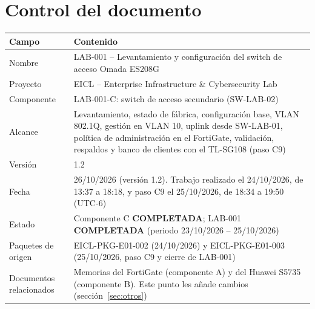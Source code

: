 \documentclass[11pt,a4paper]{article}
\newcommand{\estado}[1]{%
  \ifstrequal{#1}{COMPLETADA}{\textcolor{okgreen}{\textbf{\footnotesize #1}}}{%
  \ifstrequal{#1}{OPERATIVO VALIDADO}{\textcolor{okgreen}{\textbf{\footnotesize #1}}}{%
  \ifstrequal{#1}{OK}{\textcolor{okgreen}{\textbf{\footnotesize #1}}}{%
  \ifstrequal{#1}{RESUELTO}{\textcolor{okgreen}{\textbf{\footnotesize #1}}}{%
  \ifstrequal{#1}{EN CURSO}{\textcolor{amber}{\textbf{\footnotesize #1}}}{%
  \ifstrequal{#1}{REPORTADO}{\textcolor{amber}{\textbf{\footnotesize #1}}}{%
  \ifstrequal{#1}{NO EJECUTADA}{\textcolor{muted}{\textbf{\footnotesize #1}}}{%
  \ifstrequal{#1}{PROPUESTO}{\textcolor{violet}{\textbf{\footnotesize #1}}}{%
  \ifstrequal{#1}{PENDIENTE}{\textcolor{alertred}{\textbf{\footnotesize #1}}}{%
  \textbf{\footnotesize #1}}}}}}}}}}}
\newcommand{\cab}{\rowcolor{light}}
\begin{document}
\pagestyle{preliminar}
\hypersetup{pageanchor=true}

\section*{Control del documento}

\begin{tabularx}{\textwidth}{L{4.0cm} Z}
  \toprule
  \cab\textbf{Campo} & \textbf{Contenido}\\
  \midrule
  Nombre & LAB-001 -- Levantamiento y configuración del switch de acceso Omada ES208G\\
  Proyecto & EICL -- Enterprise Infrastructure \& Cybersecurity Lab\\
  Componente & LAB-001-C: switch de acceso secundario (SW-LAB-02)\\
  Alcance & Levantamiento, estado de fábrica, configuración base, VLAN 802.1Q, gestión en VLAN 10, uplink desde SW-LAB-01, política de administración en el FortiGate, validación, respaldos y banco de clientes con el TL-SG108 (paso C9)\\
  Versión & 1.2\\
  Fecha & 26/10/2026 (versión 1.2). Trabajo realizado el 24/10/2026, de 13:37 a 18:18, y paso C9 el 25/10/2026, de 18:34 a 19:50 (UTC-6)\\
  Estado & Componente C \estado{COMPLETADA}; LAB-001 \estado{COMPLETADA} (periodo 23/10/2026 -- 25/10/2026)\\
  Paquetes de origen & EICL-PKG-E01-002 (24/10/2026) y EICL-PKG-E01-003 (25/10/2026, paso C9 y cierre de LAB-001)\\
  Documentos relacionados & Memorias del FortiGate (componente A) y del Huawei S5735 (componente B). Este punto les añade cambios (sección~\ref{sec:otros})\\
  \bottomrule
\end{tabularx}
\end{document}

